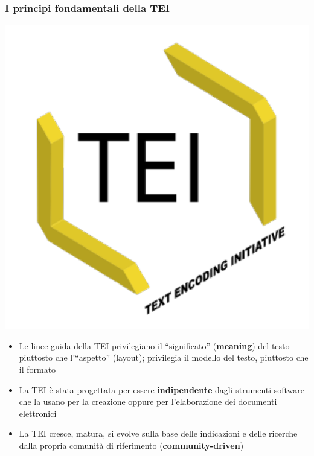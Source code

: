 \begin{frame}
	\frametitle{I principi fondamentali della TEI}
	\addtocounter{nframe}{1}
    
    \begin{center}
	    \includegraphics[width=.2\textwidth]{imgs/tei-r.pdf}
	\end{center}

    \begin{itemize}
        
        \item<1-> Le linee guida della TEI privilegiano il ``significato'' (\textbf{meaning}) del testo piuttosto che l'``aspetto'' (layout); privilegia il modello del testo, piuttosto che il formato
          
        \item<2-> La TEI è stata progettata per essere \textbf{indipendente} dagli strumenti software che la usano per la creazione oppure per l'elaborazione dei documenti elettronici

        \item<3-> La TEI cresce, matura, si evolve sulla base delle indicazioni e delle ricerche dalla propria comunità di riferimento (\textbf{community-driven})
           
    \end{itemize}
    
\end{frame}







